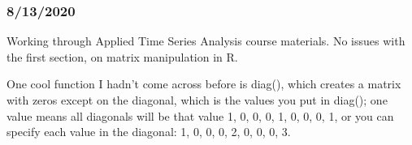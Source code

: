\documentclass[]{article}
\begin{document}
\hypertarget{section-2}{%
\subsubsection{8/13/2020}\label{section-2}}

Working through Applied Time Series Analysis course materials. No issues
with the first section, on matrix manipulation in R.

One cool function I hadn't come across before is diag(), which creates a
matrix with zeros except on the diagonal, which is the values you put in
diag(); one value means all diagonals will be that value 1, 0, 0, 0, 1,
0, 0, 0, 1, or you can specify each value in the diagonal: 1, 0, 0, 0,
2, 0, 0, 0, 3.
\end{document}
